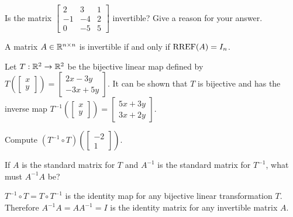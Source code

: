 \begin{applicationActivities}
\begin{activity}{5}
Is the matrix $\begin{bmatrix} 2 & 3 & 1 \\ -1 & -4 & 2 \\ 0 & -5 & 5 \end{bmatrix}$ invertible? Give a reason for your answer.
\end{activity}

\begin{observation}
 A matrix $A \in \mathbb{R}^{n \times n}$ is invertible if and only if $\operatorname{RREF}(A) = I_n$.
\end{observation}

\begin{activity}{10}
  Let \(T:\mathbb{R}^2\to\mathbb{R}^2\) be the bijective linear map defined by
  \(T\left(\begin{bmatrix}x\\y\end{bmatrix}\right)=\begin{bmatrix} 2x -3y \\ -3x + 5y\end{bmatrix}\). It can be shown that \(T\) is bijective and
  has the inverse map
  \(T^{-1}\left(\begin{bmatrix}x\\y\end{bmatrix}\right)=\begin{bmatrix} 5x+ 3y \\ 3x + 2y\end{bmatrix}\).
  \begin{subactivity}
    Compute \((T^{-1}\circ T)\left(\begin{bmatrix}-2\\1\end{bmatrix}\right)\).
  \end{subactivity}
  \begin{subactivity}
    If \(A\) is the standard matrix for \(T\) and \(A^{-1}\) is the
    standard matrix for \(T^{-1}\), what must \(A^{-1}A\) be?
  \end{subactivity}
\end{activity}

\begin{observation}
  \(T^{-1}\circ T=T\circ T^{-1}\) is the identity map for any bijective
  linear transformation \(T\). Therefore
  \(A^{-1}A=AA^{-1}=I\) is the identity matrix for any invertible matrix
  \(A\).
\end{observation}


\end{applicationActivities}
